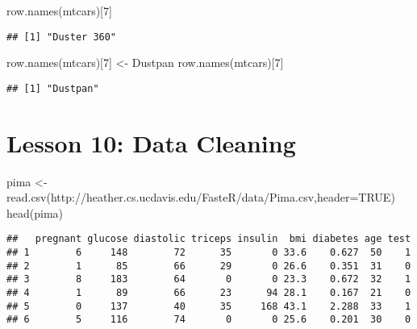 \documentclass[
]{article}
\newenvironment{Shaded}{\begin{snugshade}}{\end{snugshade}}
\newcommand{\AttributeTok}[1]{\textcolor[rgb]{0.77,0.63,0.00}{#1}}
\newcommand{\ConstantTok}[1]{\textcolor[rgb]{0.00,0.00,0.00}{#1}}
\newcommand{\DecValTok}[1]{\textcolor[rgb]{0.00,0.00,0.81}{#1}}
\newcommand{\FunctionTok}[1]{\textcolor[rgb]{0.00,0.00,0.00}{#1}}
\newcommand{\NormalTok}[1]{#1}
\newcommand{\OtherTok}[1]{\textcolor[rgb]{0.56,0.35,0.01}{#1}}
\newcommand{\StringTok}[1]{\textcolor[rgb]{0.31,0.60,0.02}{#1}}
\begin{document}
\begin{Shaded}
\begin{Highlighting}[]
\FunctionTok{row.names}\NormalTok{(mtcars)[}\DecValTok{7}\NormalTok{]}
\end{Highlighting}
\end{Shaded}

\begin{verbatim}
## [1] "Duster 360"
\end{verbatim}

\begin{Shaded}
\begin{Highlighting}[]
\FunctionTok{row.names}\NormalTok{(mtcars)[}\DecValTok{7}\NormalTok{] }\OtherTok{\textless{}{-}} \StringTok{\textquotesingle{}Dustpan\textquotesingle{}}
\FunctionTok{row.names}\NormalTok{(mtcars)[}\DecValTok{7}\NormalTok{]}
\end{Highlighting}
\end{Shaded}

\begin{verbatim}
## [1] "Dustpan"
\end{verbatim}

\hypertarget{lesson-10-data-cleaning}{%
\section{Lesson 10: Data Cleaning}\label{lesson-10-data-cleaning}}

\begin{Shaded}
\begin{Highlighting}[]
\NormalTok{pima }\OtherTok{\textless{}{-}} \FunctionTok{read.csv}\NormalTok{(}\StringTok{\textquotesingle{}http://heather.cs.ucdavis.edu/FasteR/data/Pima.csv\textquotesingle{}}\NormalTok{,}\AttributeTok{header=}\ConstantTok{TRUE}\NormalTok{)}
\FunctionTok{head}\NormalTok{(pima)}
\end{Highlighting}
\end{Shaded}

\begin{verbatim}
##   pregnant glucose diastolic triceps insulin  bmi diabetes age test
## 1        6     148        72      35       0 33.6    0.627  50    1
## 2        1      85        66      29       0 26.6    0.351  31    0
## 3        8     183        64       0       0 23.3    0.672  32    1
## 4        1      89        66      23      94 28.1    0.167  21    0
## 5        0     137        40      35     168 43.1    2.288  33    1
## 6        5     116        74       0       0 25.6    0.201  30    0
\end{verbatim}
\end{document}
